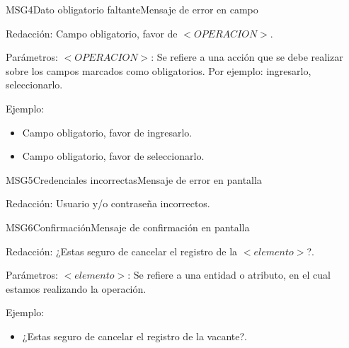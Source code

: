    
\begin{mensaje}{MSG4}{Dato obligatorio faltante}{Mensaje de error en campo}
	\item[Redacción:] Campo obligatorio, favor de $<OPERACION>$.
    \item[Parámetros:] $<OPERACION>$: Se refiere a una acción que se debe realizar sobre los campos marcados como obligatorios. Por ejemplo: ingresarlo, seleccionarlo.
    

    \item[Ejemplo:]\begin{itemize}
        
        \item Campo obligatorio, favor de ingresarlo.  
        \item Campo obligatorio, favor de seleccionarlo.
    \end{itemize} 
\end{mensaje}


\begin{mensaje}{MSG5}{Credenciales incorrectas}{Mensaje de error en pantalla}
	\item[Redacción:] Usuario y/o contraseña incorrectos.
\end{mensaje}


\begin{mensaje}{MSG6}{Confirmación}{Mensaje de confirmación en pantalla}
	\item[Redacción:] ¿Estas seguro de cancelar el registro de la $<elemento>$?.
    \item[Parámetros:] $<elemento>$: Se refiere a una entidad o atributo, en el cual estamos realizando la operación.
    \item[Ejemplo:]\begin{itemize}
        
        \item ¿Estas seguro de cancelar el registro  de la vacante?.  
    \end{itemize} 
    
\end{mensaje}


